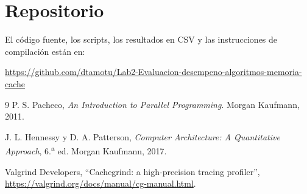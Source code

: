 \documentclass[11pt]{article}
\begin{document}
\section{Repositorio}

El código fuente, los scripts, los resultados en CSV y las instrucciones de
compilación están en:

\begin{center}
\url{https://github.com/dtamotu/Lab2-Evaluacion-desempeno-algoritmos-memoria-cache}
\end{center}

\begin{thebibliography}{9}
P. S. Pacheco, \emph{An Introduction to Parallel Programming}. Morgan Kaufmann, 2011.

J. L. Hennessy y D. A. Patterson, \emph{Computer Architecture: A Quantitative Approach}, 6.\textsuperscript{a} ed. Morgan Kaufmann, 2017.

Valgrind Developers, ``Cachegrind: a high-precision tracing profiler'',
\url{https://valgrind.org/docs/manual/cg-manual.html}.
\end{thebibliography}
\end{document}
